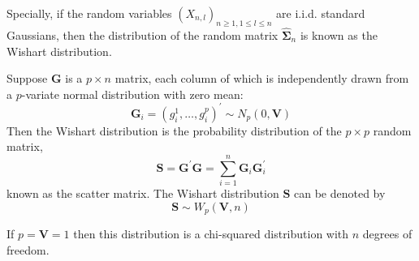 Specially, if the random variables $\left(X_{n,l}\right)_{n\geq 1,1\leq l\leq n}$ are i.i.d. standard Gaussians, then the distribution of the random matrix $\widehat{\boldsymbol{\Sigma}}_{n}$ is known as the Wishart distribution.

\begin{definition}
    Suppose $\mathbf{G}$ is a $p\times n$ matrix, each column of which is independently drawn from a $p$-variate normal distribution with zero mean:
    \begin{equation}
        \mathbf{G}_{i}=\left(g_{i}^{1},\ldots,g_{i}^{p}\right)^{\prime}\sim N_{p}(0,\mathbf{V})
    \end{equation}
    Then the Wishart distribution is the probability distribution of the $p\times p$ random matrix,
    \begin{equation}
        \mathbf{S}=\mathbf{G}^{\prime}\mathbf{G}=\sum_{i=1}^{n}\mathbf{G}_{i}\mathbf{G}_{i}^{\prime}
    \end{equation}
    known as the scatter matrix. The Wishart distribution $\mathbf{S}$ can be denoted by
    \begin{equation}
        \mathbf{S}\sim W_{p}(\mathbf{V},n)
    \end{equation}
\end{definition}
\begin{remark}
    If $p=\mathbf{V}=1$ then this distribution is a chi-squared distribution with $n$ degrees of freedom.
\end{remark}

